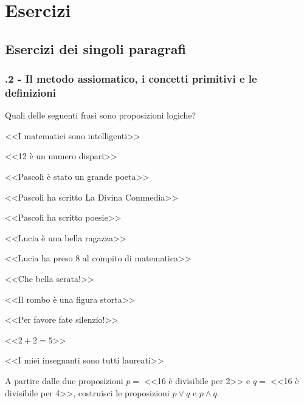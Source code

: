 \section{Esercizi}
\subsection{Esercizi dei singoli paragrafi}
\subsubsection*{\thechapter.2 - Il metodo assiomatico, i concetti primitivi e le definizioni}

\begin{esercizio}
\label{ese:1.1}
Quali delle seguenti frasi sono proposizioni logiche?
\begin{enumeratea}
\item <<I matematici sono intelligenti>>\tab\tab\qquad\boxV\quad\boxF
\item <<12 è un numero dispari>>\tab\tab\tab\qquad\boxV\quad\boxF
\item <<Pascoli è stato un grande poeta>>\tab\tab\qquad\boxV\quad\boxF
\item <<Pascoli ha scritto La Divina Commedia>>\tab\qquad\boxV\quad\boxF
\item <<Pascoli ha scritto poesie>>\tab\tab\tab\qquad\boxV\quad\boxF
\item <<Lucia è una bella ragazza>>\tab\tab\tab\qquad\boxV\quad\boxF
\item <<Lucia ha preso 8 al compito di matematica>>\tab\qquad\boxV\quad\boxF
\item <<Che bella serata!>>\tab\tab\tab\tab\qquad\boxV\quad\boxF
\item <<Il rombo è una figura storta>>\tab\tab\tab\qquad\boxV\quad\boxF
\item <<Per favore fate silenzio!>>\tab\tab\tab\qquad\boxV\quad\boxF
\item <<$2+2=5$>>\tab\tab\tab\tab\tab\qquad\boxV\quad\boxF
\item <<I miei insegnanti sono tutti laureati>>\tab\tab\qquad\boxV\quad\boxF
\end{enumeratea}
\end{esercizio}

\begin{esercizio}
\label{ese:1.2}
A partire dalle due proposizioni $p =\;$<<16 è divisibile per 2>> e $q =\;$<<16 è divisibile per 4>>, costruisci le proposizioni $p\vee q$ e $p\wedge q$.
\end{esercizio}

